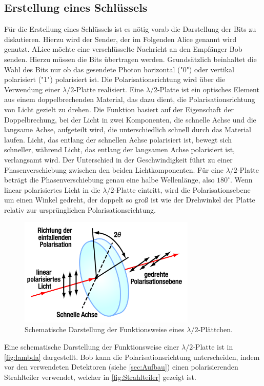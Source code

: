 \subsection{Erstellung eines Schlüssels}
Für die Erstellung eines Schlüssels ist es nötig vorab die Darstellung der Bits zu diskutieren. Hierzu wird der Sender, der im Folgenden Alice genannt wird genutzt.
ALice möchte eine verschlüsselte Nachricht an den Empfänger Bob senden. Hierzu müssen die Bits übertragen werden. Grundsätzlich beinhaltet die Wahl des Bits nur ob das gesendete Photon horizontal ("0") oder vertikal 
polarisiert ("1") polarisiert ist. 
Die Polarisationsrichtung wird über die Verwendung einer $\lambda/2$-Platte realisiert. 
Eine $\lambda/2$-Platte ist ein optisches Element aus einem doppelbrechenden Material, das dazu dient, die Polarisationsrichtung von Licht gezielt zu drehen. Die Funktion basiert auf der Eigenschaft der Doppelbrechung, bei der Licht in zwei Komponenten, die schnelle Achse und die langsame Achse, aufgeteilt wird, die unterschiedlich schnell durch das Material laufen. Licht, das entlang der schnellen Achse polarisiert ist, bewegt sich schneller, während Licht, das entlang der langsamen Achse polarisiert ist, verlangsamt wird.
Der Unterschied in der Geschwindigkeit führt zu einer Phasenverschiebung zwischen den beiden Lichtkomponenten. Für eine $\lambda/2$-Platte beträgt die Phasenverschiebung genau eine halbe Wellenlänge, also $180^\circ$. Wenn linear polarisiertes Licht in die $\lambda/2$-Platte eintritt, wird die Polarisationsebene um einen Winkel gedreht, der doppelt so groß ist wie der Drehwinkel der Platte relativ zur ursprünglichen Polarisationsrichtung.
\begin{figure}[H]
	\centering
	\includegraphics[width=0.75\textwidth]{content/grafik/lambdahalbe.png}
	\caption{Schematische Darstellung der Funktionsweise eines $\lambda /2$-Plättchen. \cite{krypt}}
	\label{fig:lambda}
\end{figure}
Eine schematische Darstellung der Funktionsweise einer $\lambda/2$-Platte ist in \autoref{fig:lambda} dargestellt.
Bob kann die Polarisationsrichtung unterscheiden, indem vor den verwendeten Detektoren (siehe \autoref{sec:Aufbau}) einen polarisierenden Strahlteiler verwendet, welcher in \autoref{fig:Strahlteiler} gezeigt ist.

